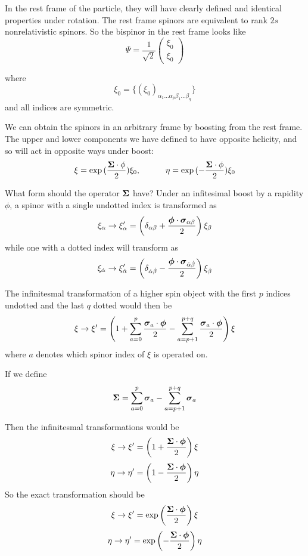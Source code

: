 In the rest frame of the particle, they will have clearly defined and identical properties under rotation.    The rest frame spinors are equivalent to rank $2s$ nonrelativistic spinors.  So the bispinor in the rest frame looks like
\[
\Psi = \frac{1}{\sqrt{2}} \begin{pmatrix} \xi_0 \\ \xi_0 \end{pmatrix}
\]

where
\[
	\xi_0 = \{ (\xi_0)_{\alpha_1 \ldots \alpha_p \beta_1 \ldots \beta_q}  \}
\]
and all indices are symmetric.

We can obtain the spinors in an arbitrary frame by boosting from the rest frame.  The upper and lower components we have defined to have opposite helicity, and so will act in opposite ways under boost:
\[
	\xi = \exp{(\frac{\ensuremath{\mathbf{\Sigma}} \cdot \ensuremath{\mathbf{\phi}}}{2}) } \xi_0,  
	\hspace{3em} 
	\eta = \exp{(-\frac{\ensuremath{\mathbf{\Sigma}} \cdot \ensuremath{\mathbf{\phi}}}{2}) } \xi_0
\]

What form should the operator $\mathbf{\Sigma}$ have?  Under an infitesimal boost by a rapidity $\phi$, a spinor with a single undotted index is transformed as
\[
	\xi_\alpha \to \xi'_\alpha = \left(\delta_{\alpha \beta} + \frac{\mbox{\boldmath$ \phi $}\cdot \mbox{\boldmath$ \sigma $}_{\alpha \beta} }{2} \right) \xi_\beta 
\]
while one with a dotted index will transform as
\[
\xi_{\dot\alpha} \to \xi'_{\dot\alpha} = \left(\delta_{\dot \alpha \dot \beta} - \frac{\mbox{\boldmath$ \phi $}\cdot \mbox{\boldmath$ \sigma $}_{\dot \alpha \dot\beta} }{2} \right) \xi_{\dot \beta}
\]


The infinitesmal transformation of a higher spin object with the first $p$ indices undotted and the last $q$ dotted would then be
\[
	\xi \to \xi' = \left(1 
		+  \sum\limits_{a=0}^p \frac{\mbox{\boldmath$ \sigma $}_a \cdot \mbox{\boldmath$ \phi $} }{2}
		- \sum\limits_{a=p+1}^{p+q} \frac{\mbox{\boldmath$ \sigma $}_a \cdot \mbox{\boldmath$ \phi $} }{2}
	\right ) \xi 
\]
where $a$ denotes which spinor index of $\xi$ is operated on.


If we define 
\[
	\mathbf{\Sigma} = \sum\limits_{a=0}^p \mbox{\boldmath$ \sigma $}_a - \sum\limits_{a=p+1}^{p+q} \mbox{\boldmath$ \sigma $}_a 
\]

Then the infinitesmal transformations would be
\[
	\xi \to \xi' = \left( 1 + \frac{\mbox{\boldmath$ \Sigma $} \cdot \mbox{\boldmath$ \phi $} }{2} \right) \xi
\]
\[
	\eta \to \eta' = \left( 1 - \frac{\mbox{\boldmath$ \Sigma $} \cdot \mbox{\boldmath$ \phi $} }{2} \right) \eta
\]
So the exact transformation should be
\[
		\xi \to \xi' = \exp\left( \frac{\mbox{\boldmath$ \Sigma $} \cdot \mbox{\boldmath$ \phi $} }{2} \right) \xi
\]
\[
	\eta \to \eta' = \exp \left( -\frac{\mbox{\boldmath$ \Sigma $} \cdot \mbox{\boldmath$ \phi $} }{2} \right) \eta
\]  
  
